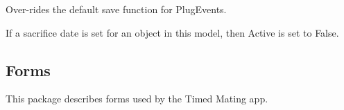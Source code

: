 \documentclass[letterpaper,10pt,english]{sphinxmanual}
\begin{document}
\begin{fulllineitems}
\begin{fulllineitems}
\label{api:timed_mating.models.PlugEvents.Researcher}
\end{fulllineitems}


\begin{fulllineitems}
\label{api:timed_mating.models.PlugEvents.get_absolute_url}
\end{fulllineitems}


\begin{fulllineitems}
\label{api:timed_mating.models.PlugEvents.get_next_by_PlugDate}
\end{fulllineitems}


\begin{fulllineitems}
\label{api:timed_mating.models.PlugEvents.get_previous_by_PlugDate}
\end{fulllineitems}


\begin{fulllineitems}
\label{api:timed_mating.models.PlugEvents.save}
Over-rides the default save function for PlugEvents.

If a sacrifice date is set for an object in this model, then Active is set to False.

\end{fulllineitems}


\end{fulllineitems}



\subsection{Forms}
\label{api:id6}\label{api:module-timed_mating.forms}
This package describes forms used by the Timed Mating app.
\end{document}
